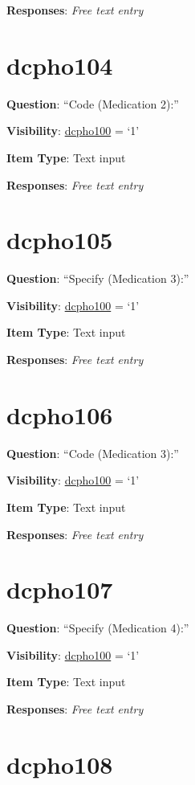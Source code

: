 \documentclass[]{book}
\begin{document}
\textbf{Responses}: \emph{Free text entry}

\hypertarget{dcpho104}{%
\section{dcpho104}\label{dcpho104}}

\textbf{Question}: ``Code (Medication 2):''

\textbf{Visibility}: \protect\hyperlink{dcpho100}{dcpho100} = `1'

\textbf{Item Type}: Text input

\textbf{Responses}: \emph{Free text entry}

\hypertarget{dcpho105}{%
\section{dcpho105}\label{dcpho105}}

\textbf{Question}: ``Specify (Medication 3):''

\textbf{Visibility}: \protect\hyperlink{dcpho100}{dcpho100} = `1'

\textbf{Item Type}: Text input

\textbf{Responses}: \emph{Free text entry}

\hypertarget{dcpho106}{%
\section{dcpho106}\label{dcpho106}}

\textbf{Question}: ``Code (Medication 3):''

\textbf{Visibility}: \protect\hyperlink{dcpho100}{dcpho100} = `1'

\textbf{Item Type}: Text input

\textbf{Responses}: \emph{Free text entry}

\hypertarget{dcpho107}{%
\section{dcpho107}\label{dcpho107}}

\textbf{Question}: ``Specify (Medication 4):''

\textbf{Visibility}: \protect\hyperlink{dcpho100}{dcpho100} = `1'

\textbf{Item Type}: Text input

\textbf{Responses}: \emph{Free text entry}

\hypertarget{dcpho108}{%
\section{dcpho108}\label{dcpho108}}
\end{document}
